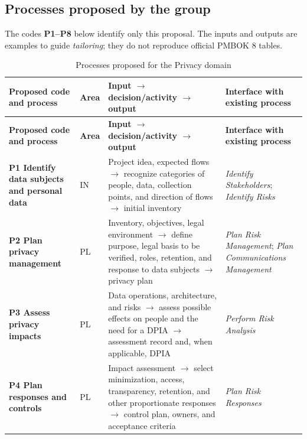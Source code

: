 \documentclass[12pt,a4paper,article,oneside,brazil,english]{abntex2}
\begin{document}
\subsection{Processes proposed by the group}

The codes \textbf{P1–P8} below identify only this proposal. The inputs and outputs are examples to guide \textit{tailoring}; they do not reproduce official PMBOK 8 tables.

\begingroup\SingleSpacing\footnotesize
\begin{longtable}{@{}>{\raggedright\arraybackslash}p{}>{\raggedright\arraybackslash}p{}>{\raggedright\arraybackslash}p{}>{\raggedright\arraybackslash}p{}@{}}
\caption{Processes proposed for the Privacy domain}\label{tab:t3}\\
\hline
\textbf{Proposed code and process} & \textbf{Area} & \textbf{Input \ensuremath{\rightarrow} decision/activity \ensuremath{\rightarrow} output} & \textbf{Interface with existing process}\\
\hline
\endfirsthead
\hline
\textbf{Proposed code and process} & \textbf{Area} & \textbf{Input \ensuremath{\rightarrow} decision/activity \ensuremath{\rightarrow} output} & \textbf{Interface with existing process}\\
\hline
\endhead
\hline
\endfoot
\hline
\endlastfoot
\textbf{P1 Identify data subjects and personal data} & IN & Project idea, expected flows \ensuremath{\rightarrow} recognize categories of people, data, collection points, and direction of flows \ensuremath{\rightarrow} initial inventory & \textit{Identify Stakeholders}; \textit{Identify Risks}\\[3pt]
\textbf{P2 Plan privacy management} & PL & Inventory, objectives, legal environment \ensuremath{\rightarrow} define purpose, legal basis to be verified, roles, retention, and response to data subjects \ensuremath{\rightarrow} privacy plan & \textit{Plan Risk Management}; \textit{Plan Communications Management}\\[3pt]
\textbf{P3 Assess privacy impacts} & PL & Data operations, architecture, and risks \ensuremath{\rightarrow} assess possible effects on people and the need for a DPIA \ensuremath{\rightarrow} assessment record and, when applicable, DPIA & \textit{Perform Risk Analysis}\\[3pt]
\textbf{P4 Plan responses and controls} & PL & Impact assessment \ensuremath{\rightarrow} select minimization, access, transparency, retention, and other proportionate responses \ensuremath{\rightarrow} control plan, owners, and acceptance criteria & \textit{Plan Risk Responses}\\[3pt]

\end{longtable}
\end{document}
